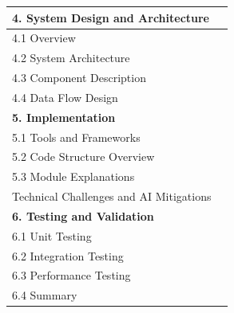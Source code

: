 \begin{longtable}{|p{13cm}|c|}
\textbf{4. System Design and Architecture} & \pageref{chapter:design} \\ \hline
\hspace{0.6cm}4.1 Overview & \pageref{sec:design:overview} \\ \hline
\hspace{0.6cm}4.2 System Architecture & \pageref{sec:design:architecture} \\ \hline
\hspace{0.6cm}4.3 Component Description & \pageref{sec:design:frontend} \\ \hline
\hspace{0.6cm}4.4 Data Flow Design & \pageref{sec:design:dataflow} \\ \hline

\textbf{5. Implementation} & \pageref{chapter:implementation} \\ \hline
\hspace{0.6cm}5.1 Tools and Frameworks & \pageref{sec:impl:pipeline} \\ \hline
\hspace{0.6cm}5.2 Code Structure Overview & \pageref{sec:impl:pipeline} \\ \hline
\hspace{0.6cm}5.3 Module Explanations & \pageref{sec:impl:endtoend} \\ \hline
\hspace{0.6cm}Technical Challenges and AI Mitigations & \pageref{sec:impl:challenges} \\ \hline

\textbf{6. Testing and Validation} & \pageref{chapter:testing} \\ \hline

\hspace{0.6cm}6.1 Unit Testing & \pageref{sec:testing:Unit} \\ \hline
\hspace{0.6cm}6.2 Integration Testing & \pageref{sec:testing:integration} \\ \hline
\hspace{0.6cm}6.3 Performance Testing & \pageref{sec:testing:performance} \\ \hline
\hspace{0.6cm}6.4 Summary & \pageref{sec:testing:Summary} \\ \hline



\end{longtable}
